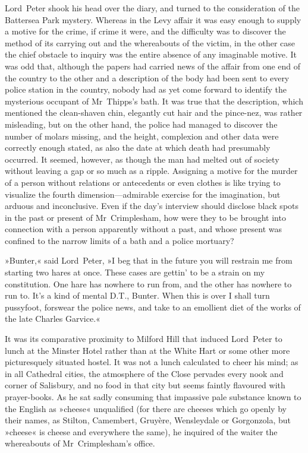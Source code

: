 Lord~Peter shook his head over the diary, and turned to the consideration of the Battersea Park mystery. Whereas in the Levy affair it was easy enough to supply a motive for the crime, if crime it were, and the difficulty was to discover the method of its carrying out and the whereabouts of the victim, in the other case the chief obstacle to inquiry was the entire absence of any imaginable motive. It was odd that, although the papers had carried news of the affair from one end of the country to the other and a description of the body had been sent to every police station in the country, nobody had as yet come forward to identify the mysterious occupant of Mr~Thipps's bath. It was true that the description, which mentioned the clean-shaven chin, elegantly cut hair and the pince-nez, was rather misleading, but on the other hand, the police had managed to discover the number of molars missing, and the height, complexion and other data were correctly enough stated, as also the date at which death had presumably occurred. It seemed, however, as though the man had melted out of society without leaving a gap or so much as a ripple. Assigning a motive for the murder of a person without relations or antecedents or even clothes is like trying to visualize the fourth dimension—admirable exercise for the imagination, but arduous and inconclusive. Even if the day's interview should disclose black spots in the past or present of Mr~Crimplesham, how were they to be brought into connection with a person apparently without a past, and whose present was confined to the narrow limits of a bath and a police mortuary?

»Bunter,« said Lord~Peter, »I beg that in the future you will restrain me from starting two hares at once. These cases are gettin' to be a strain on my constitution. One hare has nowhere to run from, and the other has nowhere to run to. It's a kind of mental D.T., Bunter. When this is over I shall turn pussyfoot, forswear the police news, and take to an emollient diet of the works of the late Charles Garvice.«

It was its comparative proximity to Milford Hill that induced Lord~Peter to lunch at the Minster Hotel rather than at the White Hart or some other more picturesquely situated hostel. It was not a lunch calculated to cheer his mind; as in all Cathedral cities, the atmosphere of the Close pervades every nook and corner of Salisbury, and no food in that city but seems faintly flavoured with prayer-books. As he sat sadly consuming that impassive pale substance known to the English as »cheese« unqualified (for there are cheeses which go openly by their names, as Stilton, Camembert, Gruyère, Wensleydale or Gorgonzola, but »cheese« is cheese and everywhere the same), he inquired of the waiter the whereabouts of Mr~Crimplesham's office.

